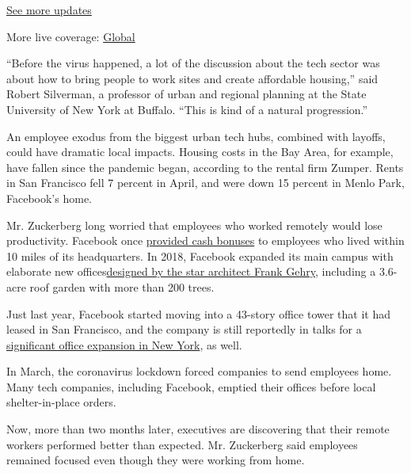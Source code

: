 \href{https://www.nytimes3xbfgragh.onion/live/2020/08/03/business/stock-market-today-coronavirus?action=click\&pgtype=Article\&state=default\&region=MAIN_CONTENT_1\&context=storylines_live_updates}{See
more updates}

More live coverage:
\href{https://www.nytimes3xbfgragh.onion/2020/08/03/world/coronavirus-covid-19.html?action=click\&pgtype=Article\&state=default\&region=MAIN_CONTENT_1\&context=storylines_live_updates}{Global}

``Before the virus happened, a lot of the discussion about the tech
sector was about how to bring people to work sites and create affordable
housing,'' said Robert Silverman, a professor of urban and regional
planning at the State University of New York at Buffalo. ``This is kind
of a natural progression.''

An employee exodus from the biggest urban tech hubs, combined with
layoffs, could have dramatic local impacts. Housing costs in the Bay
Area, for example, have fallen since the pandemic began, according to
the rental firm Zumper. Rents in San Francisco fell 7 percent in April,
and were down 15 percent in Menlo Park, Facebook's home.

Mr. Zuckerberg long worried that employees who worked remotely would
lose productivity. Facebook once
\href{https://www.reuters.com/article/us-facebook-benefits-idUSKBN0U02P620151217}{provided
cash bonuses} to employees who lived within 10 miles of its
headquarters. In 2018, Facebook expanded its main campus with elaborate
new
offices\href{https://www.bloomberg.com/news/photo-essays/2018-09-04/here-s-a-first-look-inside-facebook-s-new-frank-gehry-designed-office}{designed
by the star architect Frank Gehry}, including a 3.6-acre roof garden
with more than 200 trees.

Just last year, Facebook started moving into a 43-story office tower
that it had leased in San Francisco, and the company is still reportedly
in talks for a
\href{https://commercialobserver.com/2020/05/facebook-closing-on-740000-square-feet-at-farley-post-office/\#.XsbsRx55EbV.twitter}{significant
office expansion in New York}, as well.

In March, the coronavirus lockdown forced companies to send employees
home. Many tech companies, including Facebook, emptied their offices
before local shelter-in-place orders.

Now, more than two months later, executives are discovering that their
remote workers performed better than expected. Mr. Zuckerberg said
employees remained focused even though they were working from home.


